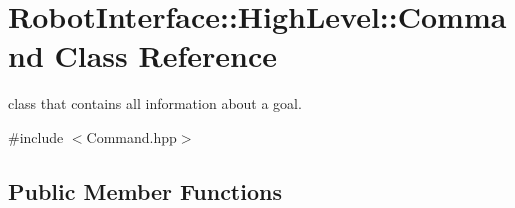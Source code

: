 \hypertarget{classRobotInterface_1_1HighLevel_1_1Command}{}\section{Robot\+Interface\+:\+:High\+Level\+:\+:Command Class Reference}
\label{classRobotInterface_1_1HighLevel_1_1Command}


class that contains all information about a goal.  




{\ttfamily \#include $<$Command.\+hpp$>$}

\subsection*{Public Member Functions}
